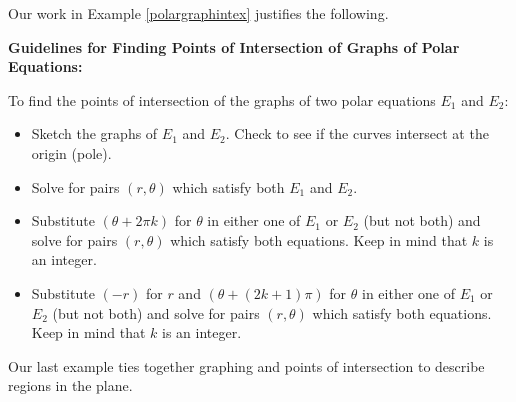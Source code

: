 \documentclass{ximera}
\begin{document}
Our work in Example \ref{polargraphintex} justifies the following.



\centerline{\textbf{Guidelines for Finding Points of Intersection of Graphs of Polar Equations:}}

To find the points of intersection of the graphs of two polar equations $E_1$ and $E_2$:

\begin{itemize}

\item  Sketch the graphs of $E_1$ and $E_2$. Check to see if the curves intersect at the origin (pole).

\item  Solve for pairs $(r,\theta)$ which satisfy both $E_1$ and $E_2$. 

\item  Substitute $(\theta + 2\pi k)$ for $\theta$ in either one of $E_1$ or $E_2$  (but not both) and solve for pairs $(r,\theta)$ which satisfy both equations.  Keep in mind that $k$ is an integer.

\item  Substitute $(-r)$ for $r$ and $(\theta + (2k+1)\pi)$ for $\theta$ in either one of $E_1$ or $E_2$ (but not both) and solve for pairs $(r,\theta)$ which satisfy both equations.  Keep in mind that $k$ is an integer.



\end{itemize}





Our last example ties together graphing and points of intersection to describe regions in the plane.
\end{document}
